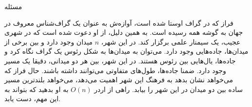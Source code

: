 ‌مسئله

فراز که در گراف اوستا شده است، آوازه‌ش به عنوان یک گراف‌شناس معروف در جهان به گوشه همه رسیده است. به همین دلیل، از او دعوت شده است که در شهری عجیب، یک سیمنار علمی برگزار کند. در این شهر، 
$n$
میدان وجود دارد و بین برخی از میدان‌ها، جاده‌هایی وجود دارد. می‌توان به میدان‌ها به شکل رئوس یک گراف نگاه کرد و جاد‌ه‌ها، یال‌هایی بین رئوس هستند. در این شهر، بین هر دو میدانی، دقیقا یک مسیر وجود دارد. ضمنا جاده‌ها، طول‌های متفاوتی می‌توانند داشته باشند. حال فراز که می‌خواهد نشان بدهد به فرهنگ این شهر اهمیت می‌دهد، می‌خواهد بلندترین مسیر ساده بین دو میدان در این شهر را بیابد. راهی از اردر 
$O(n)$
به او بدهید که بتواند به این مهم، دست یابد.
